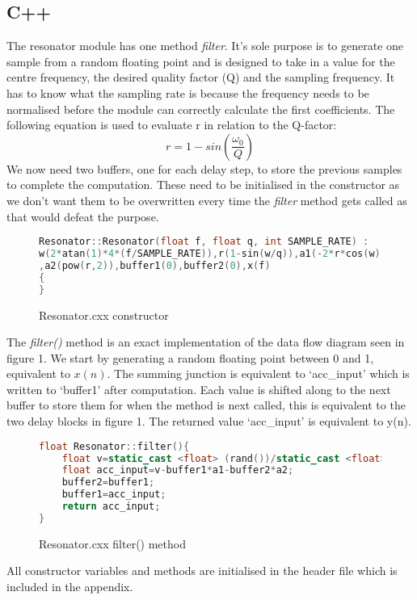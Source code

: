 \documentclass{article}
\begin{document}
\pagebreak
\subsection{C++}
The resonator module has one method \textit{filter{}}. It's sole purpose is to generate one sample from a random floating point and is designed to take in a value for the centre frequency, the desired quality factor (Q) and the sampling frequency. It has to know what the sampling rate is because the frequency needs to be normalised before the module can correctly calculate the first coefficients. The following equation is used to evaluate r in relation to the Q-factor:
\begin{equation}
r=1-sin({\frac{\omega_0}{Q}})
\end{equation}  
We now need two buffers, one for each delay step, to store the previous samples to complete the computation. These need to be initialised in the constructor as we don't want them to be overwritten every time the \textit{filter{}} method gets called as that would defeat the purpose. 
\begin{figure}[H]

\begin{lstlisting}[language=C++]
Resonator::Resonator(float f, float q, int SAMPLE_RATE) :
w(2*atan(1)*4*(f/SAMPLE_RATE)),r(1-sin(w/q)),a1(-2*r*cos(w))
,a2(pow(r,2)),buffer1(0),buffer2(0),x(f)
{
}

\end{lstlisting}
\caption{Resonator.cxx constructor}
\end{figure}

The \textit{filter()} method is an exact implementation of the data flow diagram seen in figure 1. We start by generating a random floating point between 0 and 1, equivalent to $x(n)$. The summing junction is equivalent to `acc\_input' which is written to `buffer1' after computation. Each value is shifted along to the next buffer to store them for when the method is next called, this is equivalent to the two delay blocks in figure 1. The returned value `acc\_input' is equivalent to y(n).
\begin{figure}[H]
	\begin{lstlisting}[language=C++]
float Resonator::filter(){
	float v=static_cast <float> (rand())/static_cast <float> (RAND_MAX);
	float acc_input=v-buffer1*a1-buffer2*a2;	
	buffer2=buffer1;
	buffer1=acc_input;
	return acc_input;
}	
	\end{lstlisting}
	\caption{Resonator.cxx filter() method}
\end{figure}
All constructor variables and methods are initialised in the header file which is included in the appendix.
\end{document}
